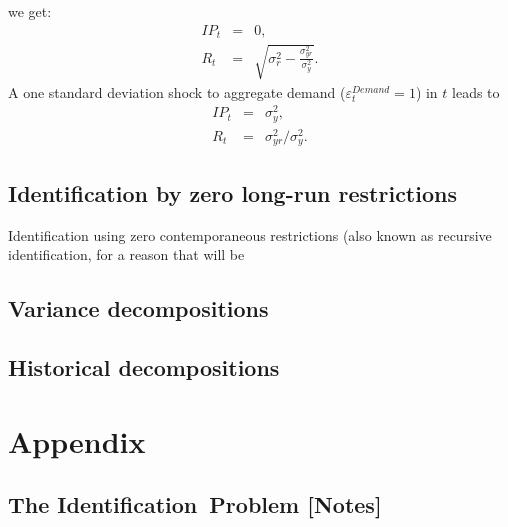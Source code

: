 \documentclass[10pt]{article}
\begin{document}
we get:%
\begin{eqnarray*}
IP_{t} &=&0, \\
R_{t} &=&\sqrt{\sigma _{r}^{2}-\frac{\sigma _{yr}^{2}}{\sigma _{y}^{2}}}.
\end{eqnarray*}%
A one standard deviation shock to aggregate demand ($\varepsilon
_{t}^{Demand}=1$) in $t$ leads to%
\begin{eqnarray*}
IP_{t} &=&\sigma _{y}^{2}, \\
R_{t} &=&\sigma _{yr}^{2}/\sigma _{y}^{2}.
\end{eqnarray*}

\subsection{Identification by zero long-run restrictions}

Identification using zero contemporaneous restrictions (also known as
recursive identification, for a reason that will be

\subsection{Variance decompositions}

\subsection{Historical decompositions}




\appendix

\section{Appendix}

\subsection{The Identification\ Problem {\color{note}
{\protect\small
{[Notes]}}}}
\end{document}
